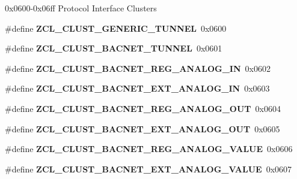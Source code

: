 0x0600-\/0x06ff Protocol Interface Clusters \begin{DoxyCompactItemize}
\item 
\hypertarget{group__zcl_ga9ac47617e3db4ad44b22c890b6a5ab47}{\#define {\bfseries Z\-C\-L\-\_\-\-C\-L\-U\-S\-T\-\_\-\-G\-E\-N\-E\-R\-I\-C\-\_\-\-T\-U\-N\-N\-E\-L}~0x0600}\label{group__zcl_ga9ac47617e3db4ad44b22c890b6a5ab47}

\item 
\hypertarget{group__zcl_ga8752b8b9d5c32c535a2bf24bd0f246f5}{\#define {\bfseries Z\-C\-L\-\_\-\-C\-L\-U\-S\-T\-\_\-\-B\-A\-C\-N\-E\-T\-\_\-\-T\-U\-N\-N\-E\-L}~0x0601}\label{group__zcl_ga8752b8b9d5c32c535a2bf24bd0f246f5}

\item 
\hypertarget{group__zcl_ga255eda08cdf2d37e7ee7d9c3171b1574}{\#define {\bfseries Z\-C\-L\-\_\-\-C\-L\-U\-S\-T\-\_\-\-B\-A\-C\-N\-E\-T\-\_\-\-R\-E\-G\-\_\-\-A\-N\-A\-L\-O\-G\-\_\-\-I\-N}~0x0602}\label{group__zcl_ga255eda08cdf2d37e7ee7d9c3171b1574}

\item 
\hypertarget{group__zcl_ga67ff2d43a5736e28d48d67b883736cff}{\#define {\bfseries Z\-C\-L\-\_\-\-C\-L\-U\-S\-T\-\_\-\-B\-A\-C\-N\-E\-T\-\_\-\-E\-X\-T\-\_\-\-A\-N\-A\-L\-O\-G\-\_\-\-I\-N}~0x0603}\label{group__zcl_ga67ff2d43a5736e28d48d67b883736cff}

\item 
\hypertarget{group__zcl_gabbb40e815833de049b591db02737c642}{\#define {\bfseries Z\-C\-L\-\_\-\-C\-L\-U\-S\-T\-\_\-\-B\-A\-C\-N\-E\-T\-\_\-\-R\-E\-G\-\_\-\-A\-N\-A\-L\-O\-G\-\_\-\-O\-U\-T}~0x0604}\label{group__zcl_gabbb40e815833de049b591db02737c642}

\item 
\hypertarget{group__zcl_ga8fea21ca7403db52e2ced5207e942584}{\#define {\bfseries Z\-C\-L\-\_\-\-C\-L\-U\-S\-T\-\_\-\-B\-A\-C\-N\-E\-T\-\_\-\-E\-X\-T\-\_\-\-A\-N\-A\-L\-O\-G\-\_\-\-O\-U\-T}~0x0605}\label{group__zcl_ga8fea21ca7403db52e2ced5207e942584}

\item 
\hypertarget{group__zcl_gaf8eec7c3306e846d7a3bb1ac6fd79f94}{\#define {\bfseries Z\-C\-L\-\_\-\-C\-L\-U\-S\-T\-\_\-\-B\-A\-C\-N\-E\-T\-\_\-\-R\-E\-G\-\_\-\-A\-N\-A\-L\-O\-G\-\_\-\-V\-A\-L\-U\-E}~0x0606}\label{group__zcl_gaf8eec7c3306e846d7a3bb1ac6fd79f94}

\item 
\hypertarget{group__zcl_ga141804cd31b8ae5223519b8c14a3c411}{\#define {\bfseries Z\-C\-L\-\_\-\-C\-L\-U\-S\-T\-\_\-\-B\-A\-C\-N\-E\-T\-\_\-\-E\-X\-T\-\_\-\-A\-N\-A\-L\-O\-G\-\_\-\-V\-A\-L\-U\-E}~0x0607}\label{group__zcl_ga141804cd31b8ae5223519b8c14a3c411}


\end{DoxyCompactItemize}
